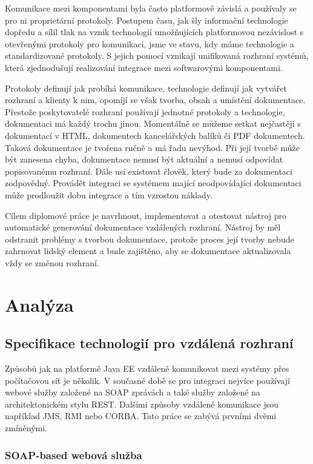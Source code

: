 \documentclass[11pt,twoside,a4paper]{book}
\begin{document}
Komunikace mezi komponentami byla často platformově závislá a používaly se pro ni
proprietární protokoly. Postupem času, jak šly informační technologie dopředu a sílil tlak na
vznik technologií umožňujících platformovou nezávislost s otevřenými protokoly pro
komunikaci, jsme ve stavu, kdy máme technologie a standardizované protokoly. S jejich
pomocí vznikají unifikovaná rozhraní systémů, která zjednodušují realizování integrace mezi
softwarovými komponentami.

Protokoly definují jak probíhá komunikace, technologie definují jak vytvářet rozhraní a
klienty k nim, opomíjí se však tvorba, obsah a umístění dokumentace. Přestože poskytovatelé
rozhraní používají jednotné protokoly a technologie, dokumentaci má každý trochu jinou.
Momentálně se můžeme setkat nejčastěji s dokumentací v HTML, dokumentech
kancelářských balíků či PDF dokumentech. Taková dokumentace je tvořena ručně a má řadu
nevýhod. Při její tvorbě může být zanesena chyba, dokumentace nemusí být aktuální a nemusí
odpovídat popisovanému rozhraní. Dále usí existovat člověk, který bude za dokumentaci
zodpovědný. Provádět integraci se systémem mající neodpovídající dokumentaci může
prodloužit dobu integrace a tím vzrostou náklady.

Cílem diplomové práce je navrhnout, implementovat a otestovat nástroj pro automatické
generování dokumentace vzdálených rozhraní. Nástroj by měl odstranit problémy s tvorbou
dokumentace, protože proces její tvorby nebude zahrnovat lidský element a bude zajištěno,
aby se dokumentace aktualizovala vždy se změnou rozhraní.

\chapter{Analýza}
\section{Specifikace technologií pro vzdálená rozhraní}
Způsobů jak na platformě Java EE vzdáleně komunikovat mezi systémy přes
počítačovou síť je několik. V současné době se pro integraci nejvíce používají
webové služby založené na SOAP zprávách a také služby založené na architektonickém stylu
REST. Dalšími způsoby vzdálené komunikace jsou například JMS, RMI nebo CORBA.
Tato práce se zabývá prvními dvěmi zmíněnými.

\subsection{SOAP-based webová služba}
\end{document}

